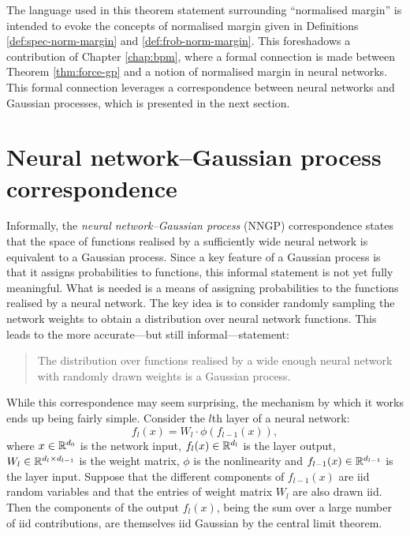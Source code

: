 \begin{refsection}
The language used in this theorem statement surrounding ``normalised margin'' is intended to evoke the concepts of normalised margin given in Definitions \ref{def:spec-norm-margin} and \ref{def:frob-norm-margin}. This foreshadows a contribution of Chapter \ref{chap:bpm}, where a formal connection is made between Theorem \ref{thm:force-gp} and a notion of normalised margin in neural networks. This formal connection leverages a correspondence between neural networks and Gaussian processes, which is presented in the next section.

\section{Neural network--Gaussian process correspondence}
\label{sec:nngp}

Informally, the \textit{neural network--Gaussian process} (NNGP) correspondence states that the space of functions realised by a sufficiently wide neural network is equivalent to a Gaussian process. Since a key feature of a Gaussian process is that it assigns probabilities to functions, this informal statement is not yet fully meaningful. What is needed is a means of assigning probabilities to the functions realised by a neural network. The key idea is to consider randomly sampling the network weights to obtain a distribution over neural network functions. This leads to the more accurate---but still informal---statement:
\begin{quote}
    The distribution over functions realised by a wide enough neural network with randomly drawn weights is a Gaussian process.
\end{quote}

While this correspondence may seem surprising, the mechanism by which it works ends up being fairly simple. Consider the $l$th layer of a neural network:
\begin{equation}\label{eq:nn-layer}
    f_l(x) = W_l\cdot \phi(f_{l-1}(x)),
\end{equation}
where $x\in\mathbb{R}^{d_0}$ is the network input, $f_l(x)\in\mathbb{R}^{d_l}$ is the layer output, $W_l\in\mathbb{R}^{d_l\times d_{l-1}}$ is the weight matrix, $\phi$ is the nonlinearity and $f_{l-1}(x)\in\mathbb{R}^{d_{l-1}}$ is the layer input. Suppose that the different components of $f_{l-1}(x)$ are iid random variables and that the entries of weight matrix $W_l$ are also drawn iid. Then the components of the output $f_l(x)$, being the sum over a large number of iid contributions, are themselves iid Gaussian by the central limit theorem.


\end{refsection}
